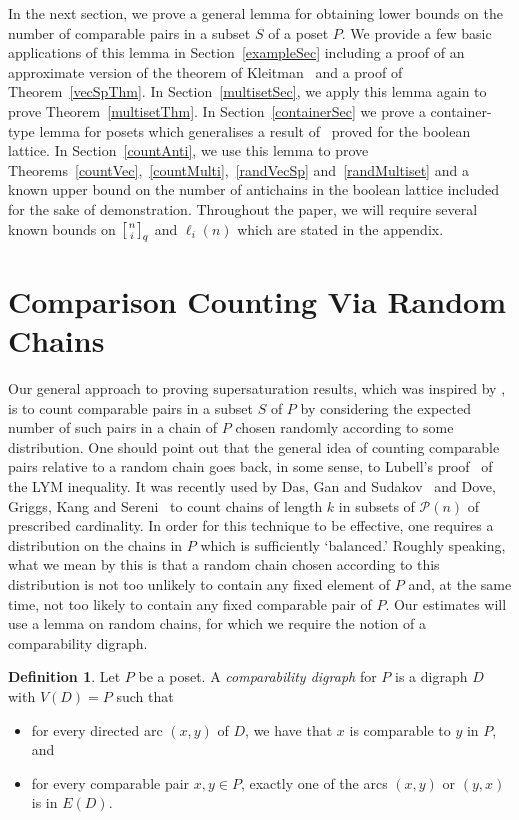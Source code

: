 \documentclass[11 pt]{article}
\theoremstyle{definition}
\newtheorem{defn}[equation]{Definition}
\theoremstyle{case}
\numberwithin{equation}{section}
\newcommand{\qbinom}[3]{\left[\genfrac{}{}{0pt}{}{#1}{#2}\right]_{#3}}
\begin{document}
In the next section, we prove a general lemma for obtaining lower bounds on the number of comparable pairs in a subset $S$ of a poset $P$. We provide a few basic applications of this lemma in Section~\ref{exampleSec} including a proof of an approximate version of the theorem of Kleitman~\cite{superKleitman} and a proof of Theorem~\ref{vecSpThm}. In Section~\ref{multisetSec}, we apply this lemma again to prove Theorem~\ref{multisetThm}. In Section~\ref{containerSec} we prove a container-type lemma for posets which generalises a result of~\cite{RandomSperner} proved for the boolean lattice. In Section~\ref{countAnti}, we use this lemma to prove Theorems~\ref{countVec},~\ref{countMulti},~\ref{randVecSp} and~\ref{randMultiset} and a known upper bound on the number of antichains in the boolean lattice included for the sake of demonstration. Throughout the paper, we will require several known bounds on $\qbinom{n}{i}{q}$ and $\ell_i(n)$ which are stated in the appendix.

\section{Comparison Counting Via Random Chains}
\label{randomChainSec}

Our general approach to proving supersaturation results, which was inspired by  \cite{DGS}, is to count comparable pairs in a subset $S$ of $P$ by considering the expected number of such pairs in a chain of $P$ chosen randomly according to some distribution. 
One should point out that the general idea of counting comparable pairs relative to a random chain goes back, in some sense, to Lubell's proof~\cite{LYML} of the LYM inequality. It was recently used
by Das, Gan and Sudakov~\cite{DGS} and Dove, Griggs, Kang and Sereni~\cite{DGKS} to count chains of length $k$ in subsets of $\mathcal{P}(n)$ of prescribed cardinality.
In order for this technique to be effective, one requires a distribution on the  chains in $P$ which is sufficiently `balanced.' Roughly speaking, what we mean by this is that a random  chain chosen according to this distribution is not too unlikely to contain any fixed element of $P$ and, at the same time, not too likely to contain any fixed comparable pair of $P$. Our estimates will use a lemma on random chains, for which we require the notion of a comparability digraph.

\begin{defn}
Let $P$ be a poset. A \emph{comparability digraph} for $P$ is a digraph $D$ with $V(D)=P$ such that
\begin{itemize}
\item for every directed arc $(x,y)$ of $D$, we have that $x$ is comparable to $y$ in $P$, and
\item for every comparable pair $x,y\in P$, exactly one of the arcs $(x,y)$ or $(y,x)$ is in $E(D)$. 
\end{itemize}
\end{defn}
\end{document}
